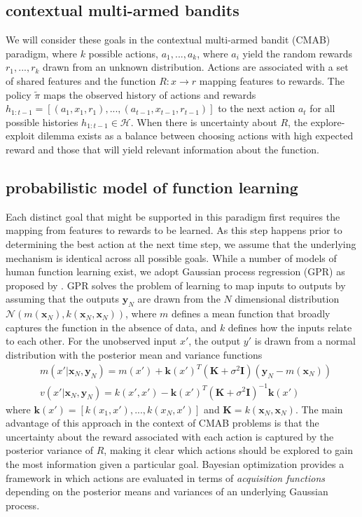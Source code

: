 \documentclass[10pt,letterpaper]{article}
\begin{document}
	\subsection{contextual multi-armed bandits}
	We will consider these goals in the contextual multi-armed bandit (CMAB) paradigm, where $k$ possible actions, $a_{1},...,a_{k}$, where $a_{i}$ yield the random rewards $r_{1},...,r_{k}$ drawn from an unknown distribution. Actions are associated with a set of shared features and the function $R: x \to r$ mapping features to rewards. The policy $\tilde{\pi}$ maps the observed history of actions and rewards $h_{1:t-1} = [(a_{1}, x_{1}, r_{1}),...,(a_{t-1}, x_{t-1}, r_{t-1})]$ to the next action $a_{t}$ for all possible histories $h_{1:t-1} \in \mathcal{H}$. When there is uncertainty about $R$, the explore-exploit dilemma exists as a balance between choosing actions with high expected reward and those that will yield relevant information about the function.
	
	\subsection{probabilistic model of function learning}
	Each distinct goal that might be supported in this paradigm first requires the mapping from features to rewards to be learned. As this step happens prior to determining the best action at the next time step, we assume that the underlying mechanism is identical across all possible goals. While a number of models of human function learning exist, we adopt Gaussian process regression (GPR) as proposed by \cite{Griffiths}. GPR solves the problem of learning to map inputs to outputs by assuming that the outputs $\mathbf{y}_{N}$ are drawn from the $N$ dimensional distribution $\mathcal{N}(m(\mathbf{x}_{N}),k(\mathbf{x}_{N},\mathbf{x}_{N}))$, where $m$ defines a mean function that broadly captures the function in the absence of data, and $k$ defines how the inputs relate to each other. For the unobserved input $x'$, the output $y'$ is drawn from a normal distribution with the posterior mean and variance functions
	\begin{equation*}
	\begin{split}
	& m(x' | \mathbf{x}_{N}, \mathbf{y}_{N}) = m(x') + \mathbf{k}(x')^{T}(\mathbf{K} + \sigma^{2} \mathbf{I}) (\mathbf{y}_{N}-m(\mathbf{x}_{N})) \\
	& v(x' | \mathbf{x}_{N}, \mathbf{y}_{N}) = k(x',x') - \mathbf{k}(x')^{T}(\mathbf{K} + \sigma^{2} \mathbf{I})^{-1}\mathbf{k}(x')
	\end{split}
	\end{equation*}
	where $\mathbf{k}(x') = [k(x_{1},x'),...,k(x_{N},x')]$ and $\mathbf{K} = k(\mathbf{x}_{N}, \mathbf{x}_{N})$. The main advantage of this approach in the context of CMAB problems is that the uncertainty about the reward associated with each action is captured by the posterior variance of $R$, making it clear which actions should be explored to gain the most information given a particular goal. Bayesian optimization \citep{Snoek} provides a framework in which actions are evaluated in terms of \textit{acquisition functions} depending on the posterior means and variances of an underlying Gaussian process.
	
\end{document}

